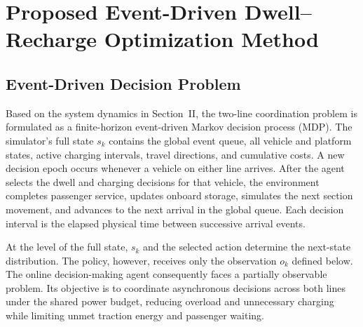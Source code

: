 \documentclass[conference]{IEEEtran}
\begin{document}
\section{Proposed Event-Driven Dwell--Recharge Optimization Method}
\subsection{Event-Driven Decision Problem}
Based on the system dynamics in Section~II, the two-line coordination problem is formulated as a finite-horizon event-driven Markov decision process (MDP). The simulator's full state $s_k$ contains the global event queue, all vehicle and platform states, active charging intervals, travel directions, and cumulative costs. A new decision epoch occurs whenever a vehicle on either line arrives. After the agent selects the dwell and charging decisions for that vehicle, the environment completes passenger service, updates onboard storage, simulates the next section movement, and advances to the next arrival in the global queue. Each decision interval is the elapsed physical time between successive arrival events.

At the level of the full state, $s_k$ and the selected action determine the next-state distribution. The policy, however, receives only the observation $o_k$ defined below. The online decision-making agent consequently faces a partially observable problem. Its objective is to coordinate asynchronous decisions across both lines under the shared power budget, reducing overload and unnecessary charging while limiting unmet traction energy and passenger waiting.
\end{document}
